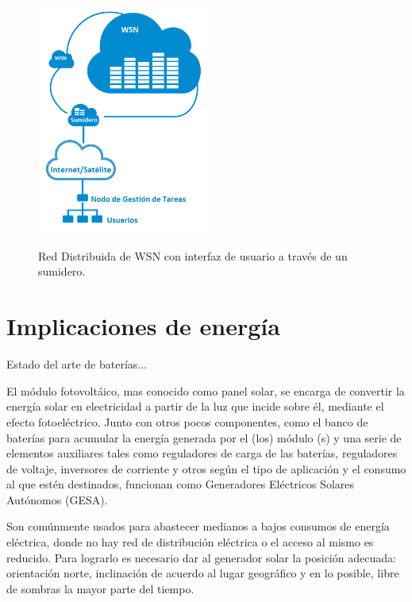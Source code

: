 \begin{figure}[h!]
	\centering
    \includegraphics[width=0.5\textwidth]{./Figures/RedDistribuida.png}
	\label{fig:distrib}
	\caption{Red Distribuida de WSN con interfaz de usuario a través de un sumidero.}
\end{figure} 

\section{Implicaciones de energía}
\label{sec:energía}

Estado del arte de baterías...

El módulo fotovoltáico, mas conocido como panel solar, se encarga de convertir la energía solar en electricidad a partir de la luz que incide sobre él, mediante el efecto fotoeléctrico. Junto con otros pocos componentes, como el banco de baterías para acumular la energía generada por el (los) módulo (s) y una serie de elementos auxiliares tales como reguladores de carga de las baterías, reguladores de voltaje, inversores de corriente y otros según el tipo de aplicación y el consumo al que estén destinados, funcionan como Generadores Eléctricos Solares Autónomos (GESA).

Son comúnmente usados para abastecer medianos a bajos consumos de energía eléctrica, donde no hay red de distribución eléctrica o el acceso al mismo es reducido. Para lograrlo es necesario dar al generador solar la posición adecuada: orientación norte, inclinación de acuerdo al lugar geográfico y en lo posible, libre de sombras la mayor parte del tiempo.

